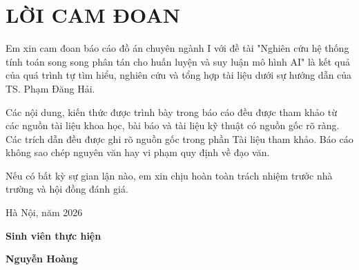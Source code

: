 \section*{LỜI CAM ĐOAN}
\thispagestyle{empty}
Em xin cam đoan báo cáo đồ án chuyên ngành I với đề tài "Nghiên cứu hệ thống tính toán song song phân tán cho huấn luyện và suy luận mô hình AI" là kết quả của quá trình tự tìm hiểu, nghiên cứu và tổng hợp tài liệu dưới sự hướng dẫn của TS. Phạm Đăng Hải.

Các nội dung, kiến thức được trình bày trong báo cáo đều được tham khảo từ các nguồn tài liệu khoa học, bài báo và tài liệu kỹ thuật có nguồn gốc rõ ràng. Các trích dẫn đều được ghi rõ nguồn gốc trong phần Tài liệu tham khảo. Báo cáo không sao chép nguyên văn hay vi phạm quy định về đạo văn.

Nếu có bất kỳ sự gian lận nào, em xin chịu hoàn toàn trách nhiệm trước nhà trường và hội đồng đánh giá.

\vspace{1cm}
\hspace{8cm}Hà Nội, năm 2026

\hspace{9cm}\textbf{Sinh viên thực hiện}

\vspace{2cm}
\hspace{9.5cm}\textbf{Nguyễn Hoàng}
\cleardoublepage